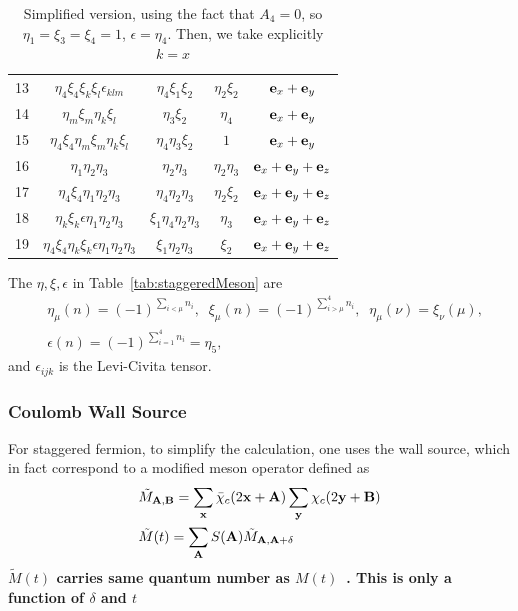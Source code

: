 \begin{table}
\begin{center}
\begin{tabular}{c|c|c|c|c}
13 & $\eta_4\xi_4\xi _k\xi _l \epsilon _{klm}$   & $\eta_4\xi _1\xi _2$            & $\eta_2\xi_2$  & ${\bf e}_x+{\bf e}_y$           \\
14 & $\eta _m\xi _m\eta _k\xi _l$                & $\eta _3\xi _2$                 & $\eta_4$       & ${\bf e}_x+{\bf e}_y$           \\
15 & $\eta_4\xi_4\eta _m\xi _m\eta _k\xi _l$     & $\eta_4\eta _3\xi _2$           & $1$            & ${\bf e}_x+{\bf e}_y$           \\
16 & $\eta _1\eta _2\eta _3$                     & $\eta _2\eta _3$                & $\eta_2\eta_3$ & ${\bf e}_x+{\bf e}_y+{\bf e}_z$ \\
17 & $\eta_4\xi_4\eta _1\eta _2\eta _3$          & $\eta_4\eta _2\eta _3$          & $\eta_2\xi_2$  & ${\bf e}_x+{\bf e}_y+{\bf e}_z$ \\
18 & $\eta_k\xi_k\epsilon\eta _1\eta _2\eta _3$  & $\xi_1\eta_4\eta _2\eta _3$     & $\eta _3$      & ${\bf e}_x+{\bf e}_y+{\bf e}_z$ \\
19 & $\eta_4\xi_4\eta_k\xi_k\epsilon\eta _1\eta _2\eta _3$ & $\xi_1\eta _2\eta _3$ & $\xi _2$       & ${\bf e}_x+{\bf e}_y+{\bf e}_z$ \\
\hline
\end{tabular}
\end{center}
\caption{\label{tab:staggeredMeson2}Simplified version, using the fact that $A_4=0$, so $\eta _1=\xi _3=\xi _4=1$, $\epsilon = \eta _4$. Then, we take explicitly $k=x$}
\end{table}

The $\eta,\xi,\epsilon$ in Table~\ref{tab:staggeredMeson} are
\begin{equation}
\begin{split}
&\eta_{\mu}(n)=(-1)^{\sum _{i<\mu} n_i},\;\;\xi _{\mu}(n)=(-1)^{\sum _{i> \mu}^4 n_i},\;\;\eta _{\mu}(\nu)=\xi _{\nu}(\mu),\\
&\epsilon (n) = (-1)^{\sum _{i=1}^4 n_i}=\eta _5,
\end{split}
\end{equation}
and $\epsilon _{ijk}$ is the Levi-Civita tensor.

\subsubsection{\label{CoulombWallSource}Coulomb Wall Source}

For staggered fermion, to simplify the calculation, one uses the wall source, which in fact correspond to a modified meson operator defined as
\begin{equation}
\begin{split}
&\tilde{M}_{{\bf A},{\bf B}}= \sum _{\bf x}\bar{\chi}_c(2{\bf x}+{\bf A}) \sum _{\bf y}\chi _c (2{\bf y}+{\bf B})\\
&\tilde{M}(t) = \sum _{\bf A} S({\bf A})\tilde{M}_{{\bf A},{\bf A}+\delta}
\end{split}
\end{equation}
\textbf{\textcolor[rgb]{0,0,1}{$\tilde{M}(t)$ carries same quantum number as $M(t)$~\cite{staggeredMeson}. This is only a function of $\delta$ and $t$}}

